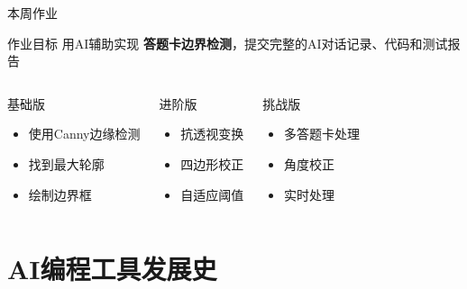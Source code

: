 \documentclass[aspectratio=169, 10pt]{beamer}
\begin{document}
\begin{frame}{本周作业}
	\begin{block}{作业目标}
		用AI辅助实现 \textbf{答题卡边界检测}，提交完整的AI对话记录、代码和测试报告
	\end{block}

	\vspace{0.5cm}

	\begin{columns}
		\begin{block}{基础版}
			\begin{itemize}
				\item 使用Canny边缘检测
				\item 找到最大轮廓
				\item 绘制边界框
			\end{itemize}
		\end{block}

		\begin{block}{进阶版}
			\begin{itemize}
				\item 抗透视变换
				\item 四边形校正
				\item 自适应阈值
			\end{itemize}
		\end{block}

		\begin{block}{挑战版}
			\begin{itemize}
				\item 多答题卡处理
				\item 角度校正
				\item 实时处理
			\end{itemize}
		\end{block}
	\end{columns}
\end{frame}

\section{AI编程工具发展史}


\end{document}

